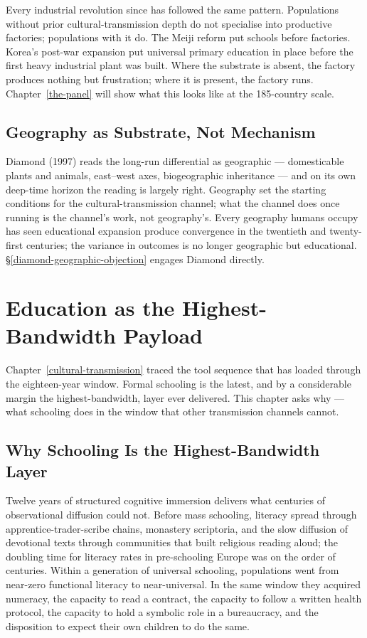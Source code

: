 \documentclass[12pt,letterpaper]{article}
\begin{document}
Every industrial revolution since has followed the same pattern.
Populations without prior cultural-transmission depth do not
specialise into productive factories; populations with it do. The
Meiji reform put schools before factories. Korea's post-war expansion
put universal primary education in place before the first heavy
industrial plant was built. Where the substrate is absent, the
factory produces nothing but frustration; where it is present, the
factory runs. Chapter~\ref{the-panel} will show what this looks like
at the 185-country scale.

\subsection{Geography as Substrate, Not Mechanism}\label{geography-as-substrate-not-mechanism}

Diamond (1997) reads the long-run differential as geographic ---
domesticable plants and animals, east--west axes, biogeographic
inheritance --- and on its own deep-time horizon the reading is
largely right. Geography set the starting conditions for the
cultural-transmission channel; what the channel does once running is
the channel's work, not geography's. Every geography humans occupy
has seen educational expansion produce convergence in
the twentieth and twenty-first centuries; the variance in outcomes is
no longer geographic but educational.
\S\ref{diamond-geographic-objection} engages Diamond
directly.

\section{Education as the Highest-Bandwidth Payload}\label{education-as-payload}

Chapter~\ref{cultural-transmission} traced the tool sequence that has
loaded through the eighteen-year window. Formal schooling is the
latest, and by a considerable margin the highest-bandwidth, layer
ever delivered. This chapter asks why --- what schooling does in the
window that other transmission channels cannot.

\subsection{Why Schooling Is the Highest-Bandwidth Layer}\label{why-schooling-is-the-highest-bandwidth-layer}

Twelve years of structured cognitive immersion delivers what centuries
of observational diffusion could not. Before mass schooling, literacy
spread through apprentice-trader-scribe chains, monastery scriptoria,
and the slow diffusion of devotional texts through communities that
built religious reading aloud; the doubling time for literacy rates
in pre-schooling Europe was on the order of centuries. Within a
generation of universal schooling, populations went from near-zero
functional literacy to near-universal. In the same window they acquired
numeracy, the capacity to read a contract, the capacity to follow a
written health protocol, the capacity to hold a symbolic role in a
bureaucracy, and the disposition to expect their own children to do
the same.
\end{document}

